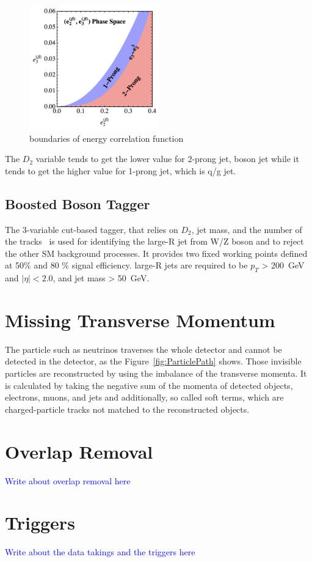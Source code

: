 \begin{figure}[tbp]
    \begin{center}
    \includegraphics[width=0.50\textwidth,keepaspectratio]{figures/Reconstruction/phasespace23}
    \caption{
    boundaries of energy correlation function \cite{Larkoski_2014}
    }
    \label{fig:phasespace23}
    \end{center}
\end{figure}
The $D_2$ variable tends to get the lower value for 2-prong jet, boson jet while it tends to get the higher value for 1-prong jet, which is q/g jet.
\subsection{Boosted Boson Tagger}
The 3-variable cut-based tagger, that relies on $D_2$, jet mass, and the number of the tracks~\cite{ATL-PHYS-PUB-2020-017} is used for identifying the large-R jet from W/Z boson and to reject the other SM background processes. It provides two fixed working points defined at 50\% and 80 \% signal efficiency. 
large-R jets are required to be $p_T$ > 200~GeV and $|\eta| <2.0$, and jet mass > 50~GeV.
\section{Missing Transverse Momentum}
The particle such as neutrinos traverses the whole detector and cannot be detected in the detector, as the Figure~\ref{fig:ParticlePath} shows. Those invisible particles are reconstructed by using the imbalance of the transverse momenta. It is calculated by taking the negative sum of the momenta of detected objects, electrons, muons, and jets and additionally, so called soft terms, which are charged-particle tracks not matched to the reconstructed objects\cite{PERF-2016-07}.
\section{Overlap Removal}
\textcolor{blue}{Write about overlap removal here}

\section{Triggers}
\textcolor{blue}{Write about the data takings and the triggers here}


